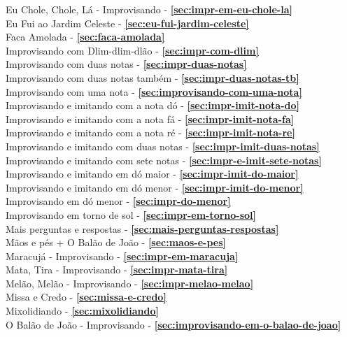 Eu Chole, Chole, Lá - Improvisando - \textbf{\ref{sec:impr-em-eu-chole-la}} \\
Eu Fui ao  Jardim Celeste - \textbf{\ref{sec:eu-fui-jardim-celeste}} \\
Faca Amolada - \textbf{\ref{sec:faca-amolada}} \\
Improvisando com Dlim-dlim-dlão - \textbf{\ref{sec:impr-com-dlim}} \\
Improvisando com duas notas - \textbf{\ref{sec:impr-duas-notas}} \\
Improvisando com duas notas também - \textbf{\ref{sec:impr-duas-notas-tb}} \\
Improvisando com uma nota - \textbf{\ref{sec:improvisando-com-uma-nota}} \\
Improvisando e imitando com a nota dó - \textbf{\ref{sec:impr-imit-nota-do}} \\
Improvisando e imitando com a nota fá - \textbf{\ref{sec:impr-imit-nota-fa}} \\
Improvisando e imitando com a nota ré - \textbf{\ref{sec:impr-imit-nota-re}} \\
Improvisando e imitando com duas notas - \textbf{\ref{sec:impr-imit-duas-notas}} \\
Improvisando e imitando com sete notas - \textbf{\ref{sec:impr-e-imit-sete-notas}} \\
Improvisando e imitando em dó maior - \textbf{\ref{sec:impr-imit-do-maior}} \\
Improvisando e imitando em dó menor - \textbf{\ref{sec:impr-imit-do-menor}} \\
Improvisando em dó menor - \textbf{\ref{sec:impr-do-menor}} \\
Improvisando em torno de sol - \textbf{\ref{sec:impr-em-torno-sol}} \\
Mais perguntas e respostas - \textbf{\ref{sec:mais-perguntas-respostas}} \\
Mãos e pés + O Balão de João - \textbf{\ref{sec:maos-e-pes}} \\
Maracujá - Improvisando - \textbf{\ref{sec:impr-em-maracuja}} \\
Mata, Tira - Improvisando - \textbf{\ref{sec:impr-mata-tira}} \\
Melão, Melão - Improvisando - \textbf{\ref{sec:impr-melao-melao}} \\
Missa e Credo - \textbf{\ref{sec:missa-e-credo}} \\
Mixolidiando - \textbf{\ref{sec:mixolidiando}} \\
O Balão de João - Improvisando - \textbf{\ref{sec:improvisando-em-o-balao-de-joao}} \\
